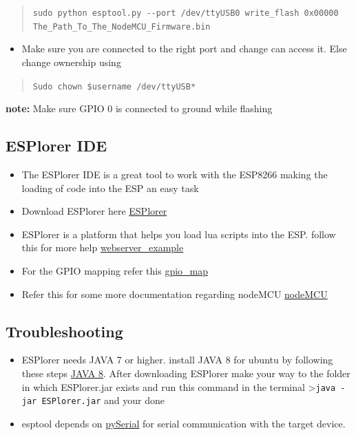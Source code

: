 \documentclass[16pt]{article}
\begin{document}
\begin{quote}
\texttt{sudo python esptool.py -{}-port /dev/ttyUSB0  write\_flash 0x00000 The\_Path\_To\_The\_NodeMCU\_Firmware.bin}
\end{quote}

\begin{itemize}

\item
  Make sure you are connected to the right port and change can access
  it. Else change ownership using
\end{itemize}

\begin{quote}
\texttt{Sudo chown \$username /dev/ttyUSB*}
\end{quote}

\textbf{note:} Make sure GPIO 0 is connected to ground while flashing
\vspace{0.5cm}

\subsection{ESPlorer IDE}

\begin{itemize}

\item
  The ESPlorer IDE is a great tool to work with the ESP8266 making the
  loading of code into the ESP an easy task
\item
  Download ESPlorer here
 {\color{red}\href{http://esp8266.ru/esplorer/\#download}{ESPlorer}}
\item
  ESPlorer is a platform that helps you load lua scripts into the ESP.
  follow this for more help
  {\color{red}\href{http://randomnerdtutorials.com/esp8266-web-server/}{webserver\_example}}
\item
  For the GPIO mapping refer this
  {\color{red}\href{https://github.com/nodemcu/nodemcu-firmware}{gpio\_map}}
\item
  Refer this for some more documentation regarding nodeMCU
  {\color{red}\href{http://www.nodemcu.com/docs/}{nodeMCU}}
\end{itemize}

\subsection{Troubleshooting}

\begin{itemize}

\item
  ESPlorer needs JAVA 7 or higher. install JAVA 8 for ubuntu by
  following these steps
  {\color{red}\href{http://tecadmin.net/install-oracle-java-8-jdk-8-ubuntu-via-ppa/}{JAVA 8}}.
  After downloading ESPlorer make your way to the folder in which
  ESPlorer.jar exists and run this command in the terminal
  \textgreater{}\texttt{java -jar ESPlorer.jar} and your done
\item
  esptool depends on {\color{red}\href{http://pyserial.sourceforge.net/}{pySerial}}
  for serial communication with the target device.
\end{itemize}
\end{document}
